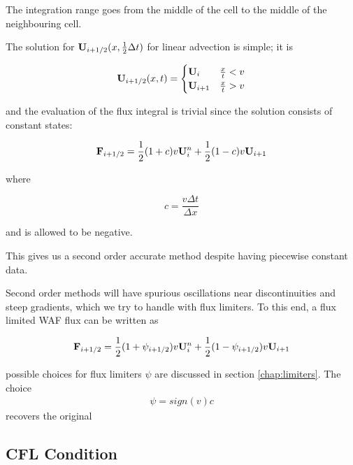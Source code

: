 The integration range goes from the middle of the cell to the middle of the neighbouring cell.

The solution for $\mathbf{U}_{i+1/2} ( x, \frac{1}{2}\Delta t)$ for linear advection is simple; it is

\begin{align}
	\mathbf{U}_{i+1/2} ( x, t) = 
		\begin{cases}
			\mathbf{U}_i 		& \frac{x}{t} < v \\
			\mathbf{U}_{i+1} 	& \frac{x}{t} > v \\
		\end{cases}
\end{align}

and the evaluation of the flux integral is trivial since the solution consists of constant states:

\begin{equation}
	\mathbf{F}_{i+1/2} =  
		\frac{1}{2} (1 + c) v \mathbf{U}_i^n + \frac{1}{2} (1 - c) v \mathbf{U}_{i+1}
\end{equation}

where

\begin{equation}
	c = \frac{v \Delta t}{\Delta x}
\end{equation}

and is allowed to be negative.


This gives us a second order accurate method despite having piecewise constant data.

Second order methods will have spurious oscillations near discontinuities and steep gradients, which we try to handle with flux limiters.
To this end, a  flux limited WAF flux can be written as

\begin{equation}
	\mathbf{F}_{i+1/2} =  
		\frac{1}{2} (1 + \psi_{i+1/2}) v \mathbf{U}_i^n + \frac{1}{2} (1 - \psi_{i+1/2}) v \mathbf{U}_{i+1}
\end{equation}

possible choices for flux limiters $\psi$ are discussed in section \ref{chap:limiters}. 
The choice
\begin{align*}
	\psi = sign(v) c
\end{align*}
recovers the original 









\subsection{CFL Condition}

